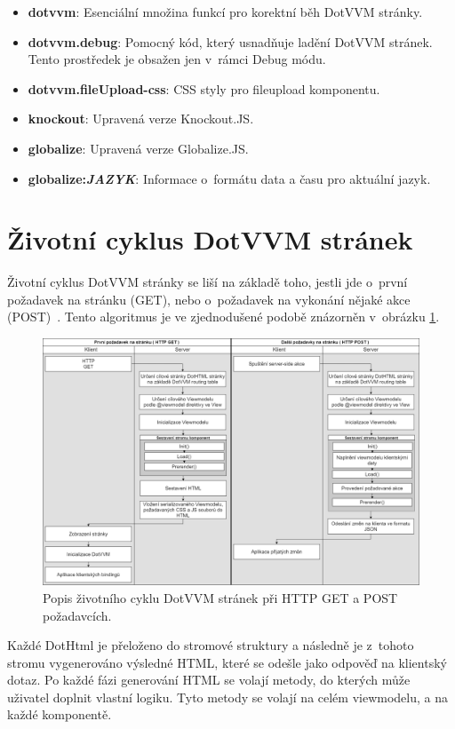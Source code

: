 \begin{itemize}
  \setlength\itemsep{0.2em}
    \item \textbf{dotvvm}:
    Esenciální množina funkcí pro korektní běh DotVVM stránky.
    \item \textbf{dotvvm.debug}:
    Pomocný kód, který usnadňuje ladění DotVVM stránek. Tento prostředek je obsažen jen v~rámci Debug módu.
    \item \textbf{dotvvm.fileUpload-css}: 
    CSS styly pro fileupload komponentu.
    \item \textbf{knockout}: 
    Upravená verze Knockout.JS.
    \item \textbf{globalize}: 
    Upravená verze Globalize.JS.
    \item \textbf{globalize:\textit{JAZYK}}:
    Informace o~formátu data a času pro aktuální jazyk.
\end{itemize}
\section{Životní cyklus DotVVM stránek}
\label{lifecycle}
Životní cyklus DotVVM stránky se liší na základě toho, jestli jde o~první požadavek na stránku (GET), nebo o~požadavek na vykonání nějaké akce (POST)~\cite{DotVVM-VM}. Tento algoritmus je ve zjednodušené podobě znázorněn v~obrázku \ref{Get a Post v DotVVM}.
\begin{figure}[!h]
	\centering
	\includegraphics[width=1\textwidth]{obrazky-figures/DotVVM_lifecycle.png}\hfill
	\caption{Popis životního cyklu DotVVM stránek při HTTP GET a POST požadavcích.}
	\label{Get a Post v DotVVM}
\end{figure}

Každé DotHtml je přeloženo do stromové struktury a následně je z~tohoto stromu vygenerováno výsledné HTML, které se odešle jako odpověď na klientský dotaz. Po každé fázi generování HTML se volají metody, do kterých může uživatel doplnit vlastní logiku. Tyto metody se volají na celém viewmodelu, a na každé komponentě.

